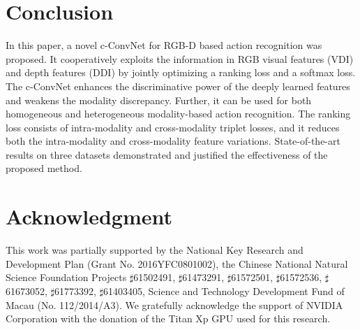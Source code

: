 \documentclass[letterpaper]{article} %
\begin{document}
\section{Conclusion}\label{conclusion}
In this paper, a novel c-ConvNet for RGB-D based action recognition was
proposed. It cooperatively exploits the information in RGB visual features
(VDI) and depth features (DDI) by
jointly optimizing a ranking loss and a softmax loss. The c-ConvNet enhances
the discriminative power of the deeply learned features and weakens the
modality discrepancy. Further, it can be used for both homogeneous and
heterogeneous modality-based action recognition. The ranking loss consists of
intra-modality and cross-modality triplet losses, and it reduces both the
intra-modality and cross-modality feature variations. State-of-the-art results
on three datasets demonstrated and justified the effectiveness of the proposed
method.

\section*{Acknowledgment}
This work was partially supported by the National Key Research and Development Plan (Grant No. 2016YFC0801002), the Chinese National Natural Science Foundation Projects $\sharp$61502491, $\sharp$61473291, $\sharp$61572501, $\sharp$61572536, $\sharp$61673052, $\sharp$61773392, $\sharp$61403405, Science and Technology Development Fund of Macau (No. 112/2014/A3). We gratefully acknowledge the support of NVIDIA Corporation with the donation of the Titan Xp GPU used for this research.
\small


\end{document}
